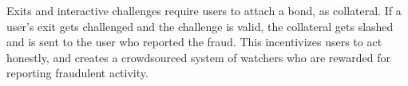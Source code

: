 Exits and interactive challenges require users to attach a bond, as collateral. If a user's exit gets challenged and the challenge is valid, the collateral gets slashed and is sent to the user who reported the fraud. This incentivizes users to act honestly, and creates a crowdsourced system of watchers who are rewarded for reporting fraudulent activity.
